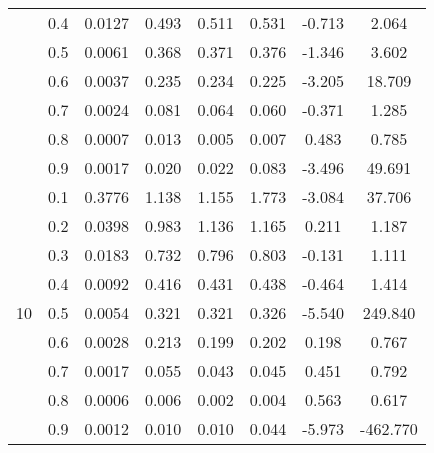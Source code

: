 \documentclass[11pt,a4paper]{report}
\begin{document}
\begin{longtable}{ | c | c || c | c | c | c | c | c | }
 & 0.4 & 0.0127 & 0.493 & 0.511 & 0.531 & -0.713 & 2.064 \\
 & 0.5 & 0.0061 & 0.368 & 0.371 & 0.376 & -1.346 & 3.602 \\
 & 0.6 & 0.0037 & 0.235 & 0.234 & 0.225 & -3.205 & 18.709 \\
 & 0.7 & 0.0024 & 0.081 & 0.064 & 0.060 & -0.371 & 1.285 \\
 & 0.8 & 0.0007 & 0.013 & 0.005 & 0.007 & 0.483 & 0.785 \\
 & 0.9 & 0.0017 & 0.020 & 0.022 & 0.083 & -3.496 & 49.691 \\
 \hline
\multirow{9}{*}{10} & 0.1 & 0.3776 & 1.138 & 1.155 & 1.773 & -3.084 & 37.706 \\
 & 0.2 & 0.0398 & 0.983 & 1.136 & 1.165 & 0.211 & 1.187 \\
 & 0.3 & 0.0183 & 0.732 & 0.796 & 0.803 & -0.131 & 1.111 \\
 & 0.4 & 0.0092 & 0.416 & 0.431 & 0.438 & -0.464 & 1.414 \\
 & 0.5 & 0.0054 & 0.321 & 0.321 & 0.326 & -5.540 & 249.840 \\
 & 0.6 & 0.0028 & 0.213 & 0.199 & 0.202 & 0.198 & 0.767 \\
 & 0.7 & 0.0017 & 0.055 & 0.043 & 0.045 & 0.451 & 0.792 \\
 & 0.8 & 0.0006 & 0.006 & 0.002 & 0.004 & 0.563 & 0.617 \\
 & 0.9 & 0.0012 & 0.010 & 0.010 & 0.044 & -5.973 & -462.770 \\
 \hline
\hline
\end{longtable}
\end{document}
